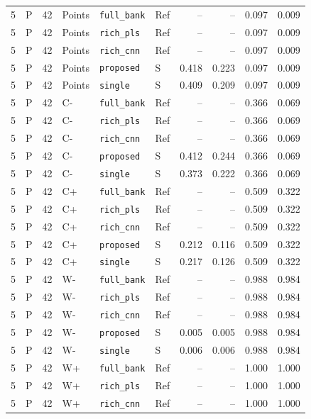 \documentclass[10pt,a4paper]{article}
\begin{document}
\begin{longtable}{rlrlllrrrr}
5 & P & 42 & Points & \texttt{full\_bank} & Ref & -- & -- & 0.097 & 0.009 \\
5 & P & 42 & Points & \texttt{rich\_pls} & Ref & -- & -- & 0.097 & 0.009 \\
5 & P & 42 & Points & \texttt{rich\_cnn} & Ref & -- & -- & 0.097 & 0.009 \\
5 & P & 42 & Points & \texttt{proposed} & S & 0.418 & 0.223 & 0.097 & 0.009 \\
5 & P & 42 & Points & \texttt{single} & S & 0.409 & 0.209 & 0.097 & 0.009 \\
5 & P & 42 & C- & \texttt{full\_bank} & Ref & -- & -- & 0.366 & 0.069 \\
5 & P & 42 & C- & \texttt{rich\_pls} & Ref & -- & -- & 0.366 & 0.069 \\
5 & P & 42 & C- & \texttt{rich\_cnn} & Ref & -- & -- & 0.366 & 0.069 \\
5 & P & 42 & C- & \texttt{proposed} & S & 0.412 & 0.244 & 0.366 & 0.069 \\
5 & P & 42 & C- & \texttt{single} & S & 0.373 & 0.222 & 0.366 & 0.069 \\
5 & P & 42 & C+ & \texttt{full\_bank} & Ref & -- & -- & 0.509 & 0.322 \\
5 & P & 42 & C+ & \texttt{rich\_pls} & Ref & -- & -- & 0.509 & 0.322 \\
5 & P & 42 & C+ & \texttt{rich\_cnn} & Ref & -- & -- & 0.509 & 0.322 \\
5 & P & 42 & C+ & \texttt{proposed} & S & 0.212 & 0.116 & 0.509 & 0.322 \\
5 & P & 42 & C+ & \texttt{single} & S & 0.217 & 0.126 & 0.509 & 0.322 \\
5 & P & 42 & W- & \texttt{full\_bank} & Ref & -- & -- & 0.988 & 0.984 \\
5 & P & 42 & W- & \texttt{rich\_pls} & Ref & -- & -- & 0.988 & 0.984 \\
5 & P & 42 & W- & \texttt{rich\_cnn} & Ref & -- & -- & 0.988 & 0.984 \\
5 & P & 42 & W- & \texttt{proposed} & S & 0.005 & 0.005 & 0.988 & 0.984 \\
5 & P & 42 & W- & \texttt{single} & S & 0.006 & 0.006 & 0.988 & 0.984 \\
5 & P & 42 & W+ & \texttt{full\_bank} & Ref & -- & -- & 1.000 & 1.000 \\
5 & P & 42 & W+ & \texttt{rich\_pls} & Ref & -- & -- & 1.000 & 1.000 \\
5 & P & 42 & W+ & \texttt{rich\_cnn} & Ref & -- & -- & 1.000 & 1.000 \\

\end{longtable}
\end{document}
